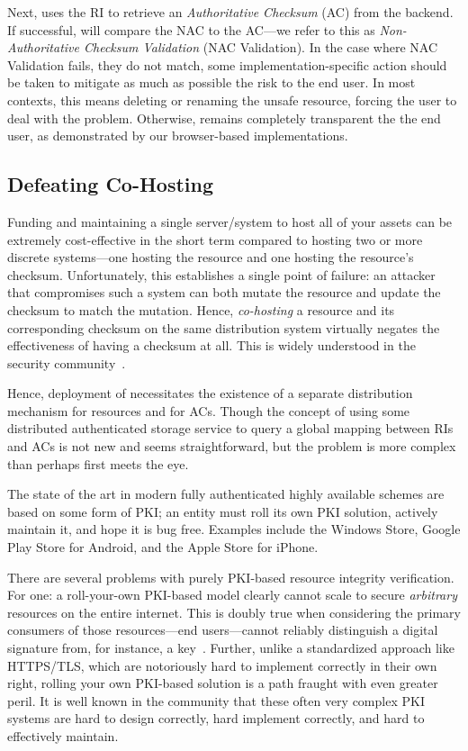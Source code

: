 Next, \SYSTEM{} uses the RI to retrieve an \emph{Authoritative Checksum} (AC)
from the backend. If successful, \SYSTEM{} will compare the NAC to the AC---we
refer to this as \emph{Non-Authoritative Checksum Validation} (NAC Validation).
In the case where NAC Validation fails, \ie they do not match, some
implementation-specific action should be taken to mitigate as much as possible
the risk to the end user. In most contexts, this means deleting or renaming the
unsafe resource, forcing the user to deal with the problem. Otherwise, \SYSTEM{}
remains completely transparent the the end user, as demonstrated by our
browser-based implementations.

\subsection{Defeating Co-Hosting}

Funding and maintaining a single server/system to host all of your assets can be
extremely cost-effective in the short term compared to hosting two or more
discrete systems---one hosting the resource and one hosting the resource's
checksum. Unfortunately, this establishes a single point of failure: an attacker
that compromises such a system can both mutate the resource and update the
checksum to match the mutation. Hence, \emph{co-hosting} a resource and its
corresponding checksum on the same distribution system virtually negates the
effectiveness of having a checksum at all. This is widely understood in the
security community~\cite{SCA-MINT2}.

Hence, deployment of \SYSTEM{} necessitates the existence of a separate
distribution mechanism for resources and for ACs. Though the concept of using
some distributed authenticated storage service to query a global mapping between
RIs and ACs is not new and seems straightforward, but the problem is more
complex than perhaps first meets the eye.

The state of the art in modern fully authenticated highly available schemes are
based on some form of PKI; an entity must roll its own PKI solution, actively
maintain it, and hope it is bug free. Examples include the Windows Store, Google
Play Store for Android, and the Apple Store for iPhone.

There are several problems with purely PKI-based resource integrity
verification. For one: a roll-your-own PKI-based model clearly cannot scale to
secure \emph{arbitrary} resources on the entire internet. This is doubly true
when considering the primary consumers of those resources---end users---cannot
reliably distinguish a digital signature from, for instance, a key~\cite{PGPBad,
Tan, Hsiao, Cherubini}. Further, unlike a standardized approach like HTTPS/TLS,
which are notoriously hard to implement correctly in their own right, rolling
your own PKI-based solution is a path fraught with even greater peril. It is
well known in the community that these often very complex PKI systems are hard
to design correctly, hard implement correctly, and hard to effectively maintain.

